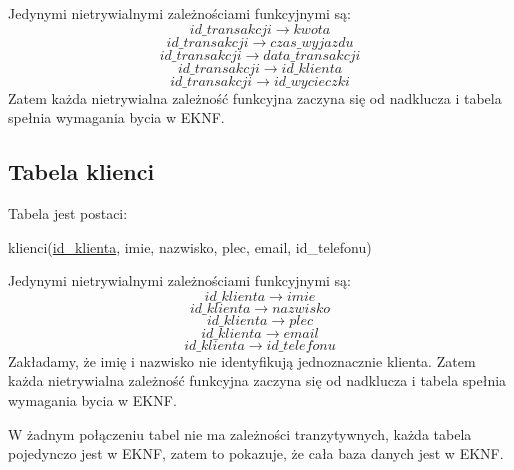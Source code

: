 \documentclass[a4paper,12pt]{mwart}
\begin{document}
\noindent Jedynymi nietrywialnymi zależnościami funkcyjnymi są:
$$   id\_transakcji\rightarrow kwota $$
$$   id\_transakcji\rightarrow czas\_wyjazdu$$
$$   id\_transakcji\rightarrow data\_transakcji $$
$$   id\_transakcji\rightarrow id\_klienta $$
$$   id\_transakcji\rightarrow id\_wycieczki $$
Zatem każda nietrywialna zależność funkcyjna zaczyna się od nadklucza i tabela  spełnia wymagania bycia w EKNF.

\subsection{Tabela klienci}
Tabela jest postaci:

klienci(\underline{id\_klienta}, imie, nazwisko, plec, email, id\_telefonu)

\noindent Jedynymi nietrywialnymi zależnościami funkcyjnymi są:
$$   id\_klienta\rightarrow imie $$
$$   id\_klienta\rightarrow nazwisko$$
$$   id\_klienta\rightarrow plec$$
$$   id\_klienta\rightarrow email $$
$$   id\_klienta\rightarrow id\_telefonu $$
Zakładamy, że imię i nazwisko nie identyfikują jednoznacznie klienta.
Zatem każda nietrywialna zależność funkcyjna zaczyna się od nadklucza i tabela  spełnia wymagania bycia w EKNF.



W żadnym połączeniu tabel nie ma zależności tranzytywnych, każda tabela pojedynczo jest w EKNF, zatem to pokazuje, że cała baza danych jest w EKNF.
\end{document}
